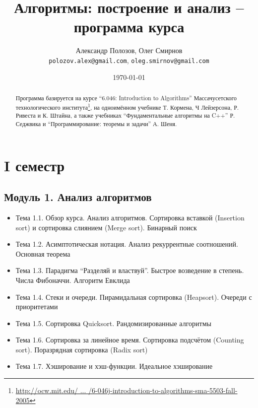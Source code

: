 \documentclass[a4paper,11pt]{article}
\author{Александр Полозов, Олег Смирнов\\
\texttt{polozov.alex@gmail.com}, \texttt{oleg.smirnov@gmail.com}}
\date{\today}
\title{Алгоритмы: построение и анализ -- программа курса}
\begin{document}
\maketitle
\begin{abstract}
Программа базируется на курсе ``6.046: Introduction to Algorithms'' 
Массачусетского технологического института\footnote{\href{http://goo.gl/jIOiq}
{http://ocw.mit.edu/ ... /6-046j-introduction-to-algorithms-sma-5503-fall-2005}},
на одноимённом учебнике Т. Кормена, Ч Лейзерсона, Р. Ривеста и К. Штайна,
а также учебниках ``Фундаментальные алгоритмы на C++'' Р. Седжвика и
``Программирование: теоремы и задачи'' А. Шеня.
\end{abstract}
\section*{I семестр}
\subsection*{Модуль 1. Анализ алгоритмов}
\begin{itemize}
\item Тема 1.1. Обзор курса. Анализ алгоритмов. Сортировка вставкой
(Insertion sort) и сортировка слиянием (Merge sort). Бинарный поиск
\item Тема 1.2. Асимптотическая нотация. Анализ рекуррентные соотношений.
Основная теорема
\item Тема 1.3. Парадигма ``Разделяй и властвуй''. Быстрое возведение в степень.
Числа Фибоначчи. Алгоритм Евклида
\item Тема 1.4. Стеки и очереди. Пирамидальная сортировка (Heapsort).
Очереди с приоритетами
\item Тема 1.5. Сортировка Quicksort. Рандомизированные алгоритмы
\item Тема 1.6. Сортировка за линейное время. Сортировка подсчётом
(Counting sort). Поразрядная сортировка (Radix sort)
\item Тема 1.7. Хэширование и хэш-функции. Идеальное хэширование
\end{itemize}
\end{document}
